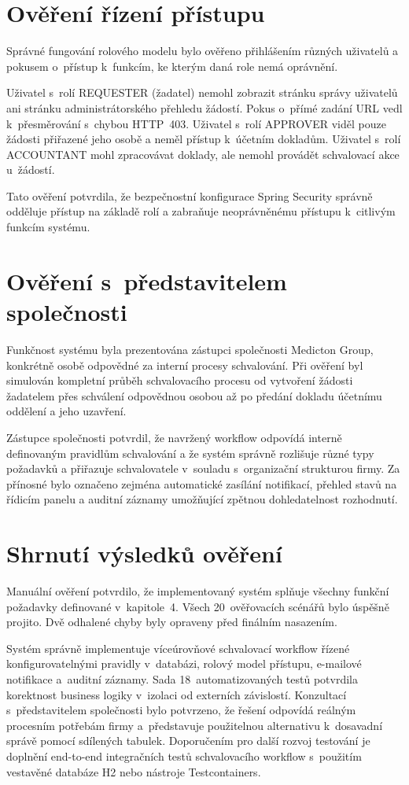 \section{Ověření řízení přístupu}

Správné fungování rolového modelu bylo ověřeno přihlášením
různých uživatelů a pokusem o~přístup k~funkcím, ke kterým
daná role nemá oprávnění.

Uživatel s~rolí REQUESTER (žadatel) nemohl zobrazit stránku
správy uživatelů ani stránku administrátorského přehledu žádostí.
Pokus o~přímé zadání URL vedl k~přesměrování s~chybou HTTP~403.
Uživatel s~rolí APPROVER viděl pouze žádosti přiřazené jeho osobě
a neměl přístup k~účetním dokladům. Uživatel s~rolí ACCOUNTANT
mohl zpracovávat doklady, ale nemohl provádět schvalovací akce
u~žádostí.

Tato ověření potvrdila, že bezpečnostní konfigurace Spring Security
správně odděluje přístup na základě rolí a zabraňuje neoprávněnému
přístupu k~citlivým funkcím systému.

\section{Ověření s~představitelem společnosti}

Funkčnost systému byla prezentována zástupci společnosti Medicton
Group, konkrétně osobě odpovědné za interní procesy schvalování.
Při ověření byl simulován kompletní průběh schvalovacího procesu
od vytvoření žádosti žadatelem přes schválení odpovědnou osobou
až po předání dokladu účetnímu oddělení a jeho uzavření.

Zástupce společnosti potvrdil, že navržený workflow odpovídá
interně definovaným pravidlům schvalování a že systém správně
rozlišuje různé typy požadavků a přiřazuje schvalovatele
v~souladu s~organizační strukturou firmy. Za přínosné bylo
označeno zejména automatické zasílání notifikací, přehled
stavů na řídicím panelu a auditní záznamy umožňující zpětnou
dohledatelnost rozhodnutí.

\section{Shrnutí výsledků ověření}

Manuální ověření potvrdilo, že implementovaný systém splňuje všechny
funkční požadavky definované v~kapitole~4. Všech 20~ověřovacích
scénářů bylo úspěšně projito. Dvě odhalené chyby byly opraveny
před finálním nasazením.

Systém správně implementuje víceúrovňové schvalovací workflow řízené
konfigurovatelnými pravidly v~databázi, rolový model přístupu,
e-mailové notifikace a~auditní záznamy. Sada 18~automatizovaných
testů potvrdila korektnost business logiky v~izolaci od externích
závislostí. Konzultací s~představitelem společnosti bylo potvrzeno,
že řešení odpovídá reálným procesním potřebám firmy a~představuje
použitelnou alternativu k~dosavadní správě pomocí sdílených tabulek.
Doporučením pro další rozvoj testování je doplnění end-to-end
integračních testů schvalovacího workflow s~použitím vestavěné
databáze H2 nebo nástroje Testcontainers.


